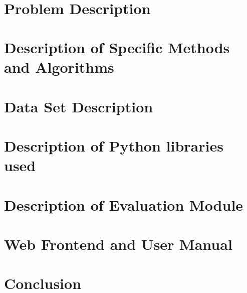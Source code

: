 \documentclass[12pt]%
{article}
\begin{document}
\begin{titlepage}

\end{titlepage}

\newpage\thispagestyle{empty}~ %
\newpage 

\begin{abstract}

\end{abstract}

\newpage

\tableofcontents

\newpage

\section{Problem Description}
\label{sec:problem_description}


\section{Description of Specific Methods and Algorithms}
\label{sec:method_descriptions}


\section{Data Set Description}
\label{sec:data_description}


\section{Description of Python libraries used}
\label{sec:python_description}


\section{Description of Evaluation Module}
\label{sec:evaluation_description}


\section{Web Frontend and User Manual}
\label{sec:frontend_description}


\section{Conclusion}


\newpage

\printglossary[style=altlist,title=Glossary]
 
\printglossary[type=\acronymtype,style=long]
 
\printglossary[type=symbolslist,style=long]

\newpage



\end{document}
